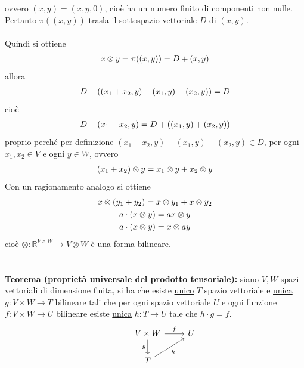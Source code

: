 \documentclass{article}
\begin{document}
ovvero $(x, y) = (x, y, 0)$, cioè ha un numero finito di componenti non nulle. Pertanto $\pi ((x, y))$ trasla il sottospazio vettoriale $D$ di $(x, y)$. \\ \\
Quindi si ottiene
\begin{gather}
    x \otimes y = \pi((x, y)) = D + (x, y) \notag
\end{gather}
allora
\begin{gather}
    D + ((x_1 + x_2, y) - (x_1, y) - (x_2, y)) = D \notag
\end{gather}
cioè
\begin{gather}
    D + (x_1 + x_2, y) = D + ((x_1, y) + (x_2, y)) \notag
\end{gather}
proprio perché per definizione $(x_1 + x_2, y) - (x_1, y) - (x_2, y) \in D$, per ogni $x_1, x_2 \in V$ e ogni $y \in W$, ovvero
\begin{gather}
    (x_1 + x_2) \otimes y = x_1 \otimes y + x_2 \otimes y \notag
\end{gather}
Con un ragionamento analogo si ottiene
\begin{gather}
    x \otimes (y_1 + y_2) = x \otimes y_1 + x \otimes y_2 \notag \\
    a \cdot (x \otimes y) = ax \otimes y \notag \\
    a \cdot (x \otimes y) = x \otimes ay \notag
\end{gather}
cioè $\otimes : \mathbb{R}^{V \times W} \longrightarrow V \otimes W$ è una forma bilineare. \\ \\ \\
\textbf{Teorema (proprietà universale del prodotto tensoriale):} siano $V, W$ spazi vettoriali di dimensione finita, si ha che esiste \underline{unico} $T$ spazio vettoriale e \underline{unica} $g : V \times W \longrightarrow T$ bilineare tali che per ogni spazio vettoriale $U$ e ogni funzione $f : V \times W \longrightarrow U$ bilineare esiste \underline{unica} $h : T \longrightarrow U$ tale che $h \cdot g = f$. \\
\[
\begin{tikzcd}
&V \times W \arrow[r,"f"] \arrow[d,"g", swap] & U \\
&T \arrow[ur, "h", swap] 
\end{tikzcd}
\]
\end{document}
